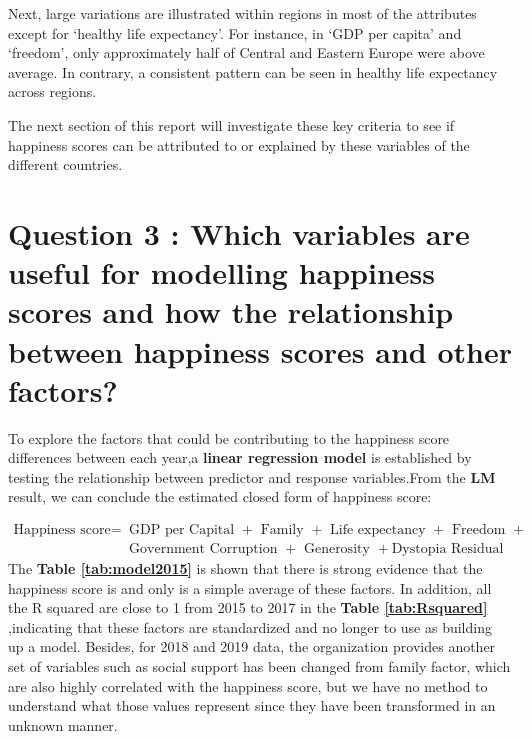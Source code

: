 \documentclass[11pt,a4paper,]{article}
\begin{document}
Next, large variations are illustrated within regions in most of the attributes except for `healthy life expectancy'. For instance, in `GDP per capita' and `freedom', only approximately half of Central and Eastern Europe were above average. In contrary, a consistent pattern can be seen in healthy life expectancy across regions.

The next section of this report will investigate these key criteria to see if happiness scores can be attributed to or explained by these variables of the different countries.

\clearpage

\hypertarget{question-3-which-variables-are-useful-for-modelling-happiness-scores-and-how-the-relationship-between-happiness-scores-and-other-factors}{%
\section{Question 3 : Which variables are useful for modelling happiness scores and how the relationship between happiness scores and other factors?}\label{question-3-which-variables-are-useful-for-modelling-happiness-scores-and-how-the-relationship-between-happiness-scores-and-other-factors}}

To explore the factors that could be contributing to the happiness score differences between each year,a \textbf{linear regression model} is established by testing the relationship between predictor and response variables.From the \textbf{LM} result, we can conclude the estimated closed form of happiness score:

\begin{align*}
\text{Happiness score} = & \text{ GDP per Capital } + \text{ Family } + \text{ Life expectancy }+ \text{ Freedom } +   \\ 
&  \text{ Government Corruption } + \text{ Generosity } + \text{Dystopia Residual }
\end{align*}
The \textbf{Table \ref{tab:model2015}} is shown that there is strong evidence that the happiness score is and only is a simple average of these factors. In addition, all the R squared are close to 1 from 2015 to 2017 in the \textbf{Table \ref{tab:Rsquared}} ,indicating that these factors are standardized and no longer to use as building up a model. Besides, for 2018 and 2019 data, the organization provides another set of variables such as social support has been changed from family factor, which are also highly correlated with the happiness score, but we have no method to understand what those values represent since they have been transformed in an unknown manner.
\end{document}
